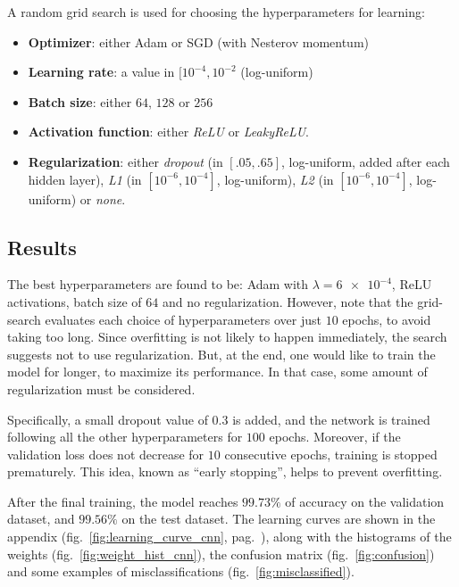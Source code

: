 \documentclass[11pt,a4paper]{scrartcl}
\newcommand{\q}[1]{``#1''}
\begin{document}
A random grid search is used for choosing the hyperparameters for learning:
\begin{itemize}
    \item \textbf{Optimizer}: either Adam or SGD (with Nesterov momentum)
    \item \textbf{Learning rate}: a value in $[10^{-4}, 10^{-2}$ (log-uniform)
    \item \textbf{Batch size}: either $64$, $128$ or $256$
    \item \textbf{Activation function}: either \textit{ReLU} or \textit{LeakyReLU}.
    \item \textbf{Regularization}: either \textit{dropout} (in $[.05, .65]$, log-uniform, added after each hidden layer), \textit{L1} (in $[10^{-6}, 10^{-4}]$, log-uniform), \textit{L2} (in $[10^{-6}, 10^{-4}]$, log-uniform) or \textit{none}.
\end{itemize} 

\subsection{Results}
The best hyperparameters are found to be: Adam with $\lambda = \num{6e-4}$, ReLU activations, batch size of $64$ and no regularization. However, note that the grid-search evaluates each choice of hyperparameters over just $10$ epochs, to avoid taking too long. Since overfitting is not likely to happen immediately, the search suggests not to use regularization. But, at the end, one would like to train the model for longer, to maximize its performance. In that case, some amount of regularization must be considered. 

\medskip

Specifically, a small dropout value of $0.3$ is added, and the network is trained following all the other hyperparameters for $100$ epochs. Moreover, if the validation loss does not decrease for $10$ consecutive epochs, training is stopped prematurely. This idea, known as \q{early stopping}, helps to prevent overfitting. 

\medskip

After the final training, the model reaches $99.73\%$ of accuracy on the validation dataset, and $99.56\%$ on the test dataset. The learning curves are shown in the appendix (fig.~\ref{fig:learning_curve_cnn}, pag.~\pageref{fig:learning_curve_cnn}), along with the histograms of the weights (fig.~\ref{fig:weight_hist_cnn}), the confusion matrix (fig.~\ref{fig:confusion}) and some examples of misclassifications (fig.~\ref{fig:misclassified}).
\end{document}
